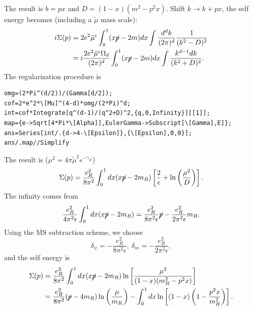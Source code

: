 The result is $b = p x$ and $D = (1-x)(m^2-p^2 x)$.
Shift $k \rightarrow k + px$, the self energy becomes (including a $\tilde \mu$ mass scale):
\begin{equation}
\begin{aligned}
	i\Sigma(p)
	&= 2e^2\tilde{\mu}^{\epsilon} 
		\int_0^1 (x\cancel{p}-2m)dx 
		\int \frac{d^d k}{(2\pi)^d} 
		\frac{1}{(k^2-D)^2} \\
	&= i\frac{2e^2 \tilde{\mu}^{\epsilon}\Omega_d}{(2\pi)^d}
		\int_0^1 (x\cancel{p}-2m)dx
		\int \frac{k^{d-1} dk}{(k^2+D)^2}.
\end{aligned}
\end{equation}
The regularization procedure is
\begin{lstlisting}[style=mathematicaFrameTB]
omg=(2*Pi^(d/2))/(Gamma[d/2]);
cof=2*e^2*\[Mu]^(4-d)*omg/(2*Pi)^d;
int=cof*Integrate[q^(d-1)/(q^2+D)^2,{q,0,Infinity}][[1]];
map={e->Sqrt[4*Pi*\[Alpha]],EulerGamma->Subscript[\[Gamma],E]};
ans=Series[int/.{d->4-\[Epsilon]},{\[Epsilon],0,0}];
ans/.map//Simplify
\end{lstlisting}
The result is ($\mu^2 = 4\pi \tilde\mu^2 e^{-\gamma_E}$)
\begin{equation}
	\Sigma(p) = \frac{e_R^2}{8\pi^2}\int_0^1 dx(x\cancel{p}-2m_R)\left[\frac{2}{\epsilon}+\ln\left(\frac{\mu^2}{D}\right)\right].
\end{equation}
The infinity comes from
\begin{equation}
	\frac{e_R^2}{4\pi^2\epsilon}\int_0^1 dx(x\cancel{p}-2m_R)
	= \frac{e_R^2}{8\pi^2\epsilon}\cancel{p} - \frac{e_R^2}{2\pi^2\epsilon}m_R.
\end{equation}
Using the $\overline{\mathrm{MS}}$ subtraction scheme, we choose
\begin{equation}
	\delta_{\psi} = -\frac{e_R^2}{8\pi^2\epsilon},\ 
	\delta_m = -\frac{e_R^2}{2\pi^2\epsilon},
\end{equation}
and the self energy is
\begin{equation}
\begin{aligned}
	\Sigma(p) 
	&= \frac{e_R^2}{8\pi^2}\int_0^1 dx(x\cancel{p}-2m_R)\ln\left[\frac{\mu^2}{(1-x)(m_R^2-p^2 x)}\right] \\
	&= \frac{e_R^2}{8\pi^2}(\cancel{p}-4m_R)\ln\left(\frac{\mu}{m_R}\right)-\int_0^1 dx \ln\left[(1-x)\left(1-\frac{p^2x}{m_R^2}\right)\right].
\end{aligned}
\end{equation}



